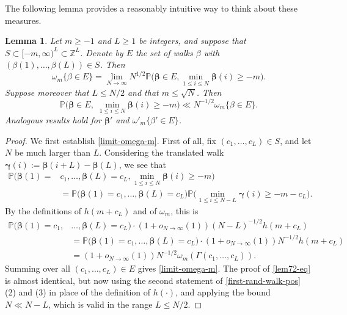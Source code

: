 \documentclass[11pt,reqno]{amsart}
\numberwithin{equation}{section}
\newtheorem{lemma}[theorem]{Lemma}
\theoremstyle{definition}
\theoremstyle{remark}
\newcommand{\mb}{\mathbb}
\def\boldbeta{\boldsymbol\beta}
\def\boldgamma{\boldsymbol\gamma}
\renewcommand{\le}{\leqslant}
\renewcommand{\ge}{\geqslant}
\newcommand\Z{\mathbb{Z}}
\begin{document}
The following lemma provides a reasonably intuitive way to think about these measures.
\begin{lemma}\label{lemma7.2}
Let $m \ge -1$ and $L \ge 1$ be integers, and suppose that $S \subset [-m, \infty)^L \subset \Z^L$. Denote by $E$ the set of walks $\beta$ with $(\beta(1),\dots, \beta(L)) \in S$. Then 
\begin{equation}\label{limit-omega-m} \omega_m \{ \beta \in E\}  = \lim_{N \rightarrow \infty} N^{1/2}\mb{P} \big(\boldbeta \in E , \min_{1 \le i \le N} \boldbeta(i) \ge -m\big). \end{equation}
Suppose moreover that $L \le N/2$ and that $m \le \sqrt{N}$. Then
\begin{equation}\label{lem72-eq}  \mb{P} \big(\boldbeta \in E, \; \min_{1 \le i \le N} \boldbeta(i) \ge -m\big) \ll  N^{-1/2} \omega_m \{ \beta \in E \}.\end{equation}
Analogous results hold for $\boldbeta'$ and $\omega'_m \{ \beta' \in E\}$.
\end{lemma}
\begin{proof}
We first establish \cref{limit-omega-m}. First of all, fix $(c_1,\dots, c_L) \in S$, and let $N$ be much larger than $L$. Considering the translated walk $\boldgamma(i) := \boldbeta(i + L) - \boldbeta(L)$, we see that 
\begin{align*} \mb{P}\big(\boldbeta(1) = & c_1,\dots, \boldbeta(L) = c_L , \min_{1 \le i \le N} \boldbeta(i) \ge - m\big)\\ & = \mb{P}\big(\boldbeta(1) = c_1,\dots, \boldbeta(L) = c_L \big) \mb{P}\big( \min_{1 \le i \le N - L} \boldgamma(i) \ge -m - c_L\big).\end{align*} By the definitions of $h(m + c_L)$ and of $\omega_m$, this is
\begin{align*}  \mb{P}\big(\boldbeta(1) = c_1, & \dots, \boldbeta(L) = c_L \big) \cdot (1 + o_{N \rightarrow \infty}(1)) (N - L)^{-1/2} h(m + c_L) \\ & = \mb{P}\big(\boldbeta(1) = c_1,\dots, \boldbeta(L) = c_L \big) \cdot (1 + o_{N \rightarrow \infty}(1)) N^{-1/2} h(m + c_L) \\ & = (1 + o_{N \rightarrow \infty}(1)) N^{-1/2} \omega_m (\Gamma(c_1,\dots, c_L)).\end{align*}
Summing over all $(c_1,\dots, c_L) \in E$ gives \cref{limit-omega-m}. The proof of \cref{lem72-eq} is almost identical, but now using the second statement of \cref{first-rand-walk-pos} (2) and (3) in place of the definition of $h( \cdot)$, and applying the bound $N \ll N - L$, which is valid in the range $L \le N/2$.
\end{proof}
\end{document}
